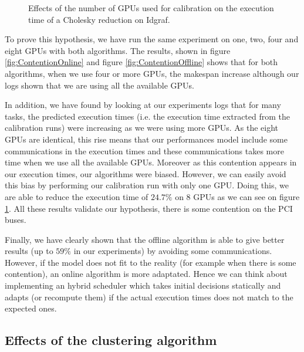 \documentclass[10pt, conference, compsocconf,pdftex,dvipsnames]{IEEEtran}
\newcommand{\mytodo}[1]{\todo[inline]{#1}}
\begin{document}
\begin{figure}[htb]
        \scalebox{0.6}{
    \centering
    
        }
    \caption{Effects of the number of GPUs used for calibration on the
    execution time of a Cholesky reduction on Idgraf.}
    \label{fig:ContentionTrick}
\end{figure}

\mytodo{update this par}
To prove this hypothesis, we have run the same experiment on one, two, four
and eight GPUs with both algorithms. The results, shown in figure
\ref{fig:ContentionOnline} and figure \ref{fig:ContentionOffline} shows that
for both algorithms, when we use four or more GPUs, the makespan increase
although our logs shown that we are using all the available GPUs.
%

In addition, we have found by looking at our experiments logs that for many
tasks, the predicted execution times (i.e. the execution time extracted from
the calibration runs) were increasing as we were using more GPUs. As the eight
GPUs are identical, this rise means that our performances model include some
communications in the execution times and these communications takes more time
when we use all the available GPUs. Moreover as this contention appears in our
execution times, our algorithms were biased. However, we can easily avoid this
bias by performing our calibration run with only one GPU. Doing this, we are
able to reduce the execution time of $24.7\%$ on 8 GPUs as we can see on
figure \ref{fig:ContentionTrick}. All these results validate our hypothesis,
there is some contention on the PCI buses.

Finally, we have clearly shown that the offline algorithm is able to give
better results (up to $59\%$ in our experiments) by avoiding some
communications. However, if the model does not fit to the reality (for example
when there is some contention), an online algorithm is more adaptated. Hence
we can think about implementing an hybrid scheduler which takes initial
decisions statically and adapts (or recompute them) if the actual execution
times does not match to the expected ones.

\subsection{Effects of the clustering algorithm}
\label{sec:exp-exp-clust}
\mytodo{Remove this par}
\end{document}
